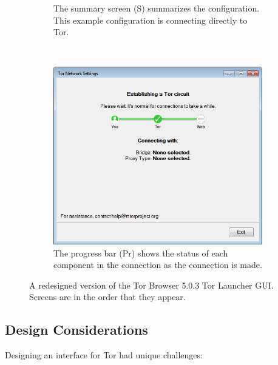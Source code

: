 \documentclass[USenglish,oneside,twocolumn]{article}
\begin{document}
\begin{figure}
\begin{subfigure}[b]{0.30\textwidth}
	\centering\captionsetup{width=1.5\linewidth}%
	\caption{The summary screen (S) summarizes the configuration. This example configuration is connecting directly to Tor.}
	\label{fig:new-summary}
\end{subfigure}
~~~~~~~~~~~~~~~~~~~~~~~~~
\begin{subfigure}[b]{0.30\textwidth}
	\includegraphics[width=\textwidth]{screenshots/NEW-progress.png}
	\centering\captionsetup{width=1.5\linewidth}%
	\caption{The progress bar (Pr) shows the status of each component in the connection as the connection is made.}
	\label{fig:new-progress}
\end{subfigure}
\caption{
A redesigned version of the Tor Browser 5.0.3 Tor Launcher GUI. Screens are in the order that they appear. 
}
\label{fig:new-interface}
\end{figure} 

\subsection {Design Considerations} 

Designing an interface for Tor had unique challenges: \\
\end{document}
